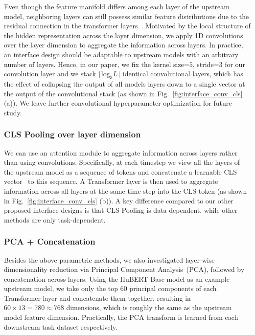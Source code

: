 Even though the feature manifold differs among each layer of the upstream model, neighboring layers can still possess similar feature distributions due to the residual connection in the transformer layers~\cite{vaswani2017attention}.
Motivated by the local structure of the hidden representation across the layer dimension, we apply 1D convolutions over the layer dimension to aggregate the information across layers.
In practice, an interface design should be adaptable to upstream models with an arbitrary number of layers.
Hence, in our paper, we fix the kernel size=$5$, stride=$3$ for our convolution layer and we stack $\lfloor \mathrm{log}_3{L} \rfloor$ identical convolutional layers, which has the effect of collapsing the output of all models layers down to a single vector at the output of the convolutional stack (as shown in Fig.~\ref{fig:interface_conv_cls} (a)).
We leave further convolutional hyperparameter optimization for future study.

\subsubsection{CLS Pooling over layer dimension}

We can use an attention module to aggregate information across layers rather than using convolutions.
Specifically, at each timestep we view all the layers of the upstream model as a sequence of tokens and concatenate a learnable CLS vector~\cite{devlin-etal-2019-bert} to this sequence. A Transformer layer is then used to aggregate information across all layers at the same time step into the CLS token (as shown in Fig.~\ref{fig:interface_conv_cls} (b)). 
A key difference compared to our other proposed interface designs is that CLS Pooling is data-dependent, while other methods are only task-dependent. 

\subsubsection{PCA + Concatenation}

Besides the above parametric methods, we also investigated layer-wise dimensionality reduction via Principal Component Analysis~(PCA), followed by concatenation across layers. Using the HuBERT Base model as an example upstream model, we take only the top 60 principal components of each Transformer layer and concatenate them together, resulting in $60\times 13=780 \approx768$ dimensions, which is roughly the same as the upstream model feature dimension. 
Practically, the PCA transform is learned from each downstream task dataset respectively.

